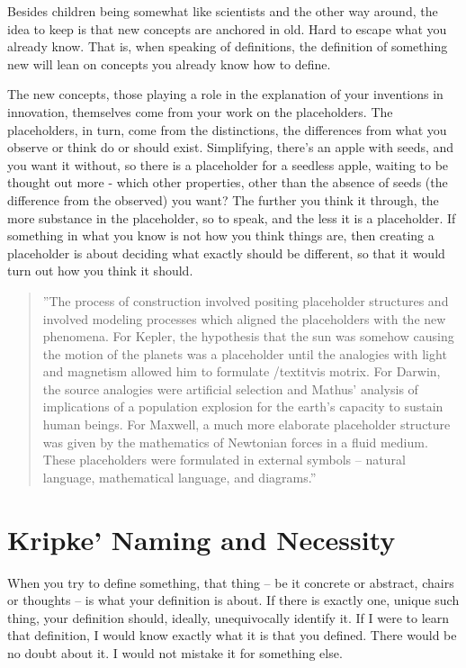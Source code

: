 Besides children being somewhat like scientists and the other way around, the idea to keep is that new concepts are anchored in old. Hard to escape what you already know. That is, when speaking of definitions, the definition of something new will lean on concepts you already know how to define. 

The new concepts, those playing a role in the explanation of your inventions in innovation, themselves come from your work on the placeholders. The placeholders, in turn, come from the distinctions, the differences from what you observe or think do or should exist. Simplifying, there's an apple with seeds, and you want it without, so there is a placeholder for a seedless apple, waiting to be thought out more - which other properties, other than the absence of seeds (the difference from the observed) you want? The further you think it through, the more substance in the placeholder, so to speak, and the less it is a placeholder. If something in what you know is not how you think things are, then creating a placeholder is about deciding what exactly should be different, so that it would turn out how you think it should. 

\begin{quote}
''The process of construction involved positing placeholder structures and involved modeling processes which aligned the placeholders with the new phenomena. For Kepler, the hypothesis that the sun was somehow causing the motion of the planets was a placeholder until the analogies with light and magnetism allowed him to formulate /textit{vis motrix}. For Darwin, the source analogies were artificial selection and Mathus' analysis of implications of a population explosion for the earth's capacity to sustain human beings. For Maxwell, a much more elaborate placeholder structure was given by the mathematics of Newtonian forces in a fluid medium. These placeholders were formulated in external symbols -- natural language, mathematical language, and diagrams.'' \cite{carey2011precis}
\end{quote}



\section{Kripke' Naming and Necessity}
\label{c4:s5}
When you try to define something, that thing -- be it concrete or abstract, chairs or thoughts -- is what your definition is about. If there is exactly one, unique such thing, your definition should, ideally, unequivocally identify it. If I were to learn that definition, I would know exactly what it is that you defined. There would be no doubt about it. I would not mistake it for something else.

